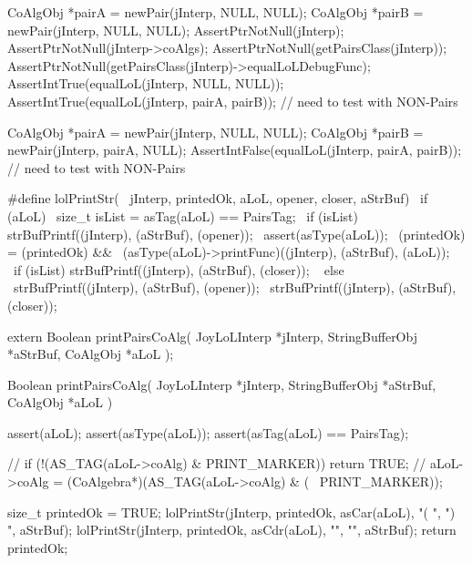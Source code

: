 \startCTest
  CoAlgObj *pairA = newPair(jInterp, NULL, NULL);
  CoAlgObj *pairB = newPair(jInterp, NULL, NULL);
  AssertPtrNotNull(jInterp);
  AssertPtrNotNull(jInterp->coAlgs);
  AssertPtrNotNull(getPairsClass(jInterp));
  AssertPtrNotNull(getPairsClass(jInterp)->equalLoLDebugFunc);
  AssertIntTrue(equalLoL(jInterp, NULL, NULL));
  AssertIntTrue(equalLoL(jInterp, pairA, pairB));
  // need to test with NON-Pairs
\stopCTest
\stopTestCase

\startCTest
  CoAlgObj *pairA = newPair(jInterp, NULL,  NULL);
  CoAlgObj *pairB = newPair(jInterp, pairA, NULL);
  AssertIntFalse(equalLoL(jInterp, pairA, pairB));
  // need to test with NON-Pairs
\stopCTest
\stopTestCase
\stopTestSuite


\startCHeader
#define lolPrintStr(                                           \
  jInterp, printedOk, aLoL, opener, closer, aStrBuf)           \
  if (aLoL) {								                                   \
    size_t isList = asTag(aLoL) == PairsTag;        			     \
    if (isList) strBufPrintf((jInterp), (aStrBuf), (opener));  \
    assert(asType(aLoL));						                           \
    (printedOk) = (printedOk) && 						                   \
      (asType(aLoL)->printFunc)((jInterp), (aStrBuf), (aLoL)); \
    if (isList) strBufPrintf((jInterp), (aStrBuf), (closer));  \
  } else {								                                     \
    strBufPrintf((jInterp), (aStrBuf), (opener));						   \
    strBufPrintf((jInterp), (aStrBuf), (closer));						   \
  }
\stopCHeader

\setCHeaderStream{private}
\startCHeader
extern Boolean printPairsCoAlg(
  JoyLoLInterp    *jInterp,
  StringBufferObj *aStrBuf,
  CoAlgObj        *aLoL
);
\stopCHeader
\setCHeaderStream{public}

\startCCode
Boolean printPairsCoAlg(
  JoyLoLInterp    *jInterp,
  StringBufferObj *aStrBuf,
  CoAlgObj        *aLoL
) {
  assert(aLoL);
  assert(asType(aLoL));
  assert(asTag(aLoL) == PairsTag);

//  if (!(AS_TAG(aLoL->coAlg) & PRINT_MARKER)) return TRUE;
//  aLoL->coAlg = (CoAlgebra*)(AS_TAG(aLoL->coAlg) & (~ PRINT_MARKER));

  size_t printedOk = TRUE;
  lolPrintStr(jInterp, printedOk, asCar(aLoL), "( ", ") ", aStrBuf);
  lolPrintStr(jInterp, printedOk, asCdr(aLoL), "",   "",   aStrBuf);
  return printedOk;
}
\stopCCode

